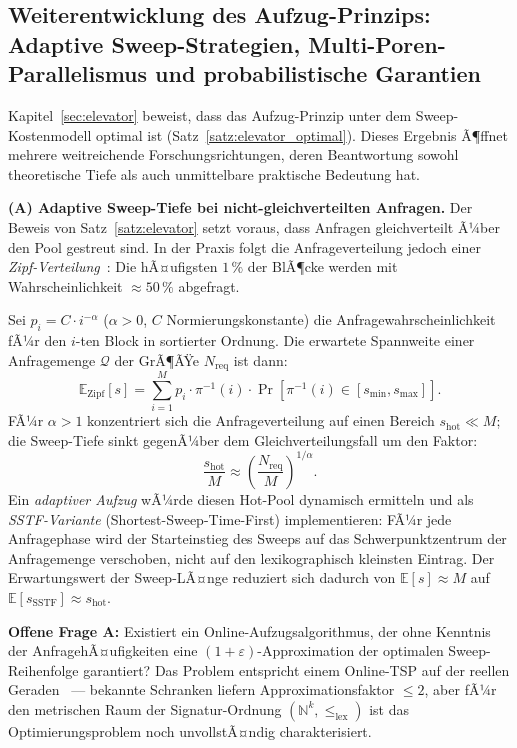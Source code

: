 ﻿\documentclass[a4paper,12pt]{article}
\theoremstyle{definition}
\theoremstyle{plain}
\begin{document}
\subsection{Weiterentwicklung des Aufzug-Prinzips: Adaptive Sweep-Strategien,
           Multi-Poren-Parallelismus und probabilistische Garantien}
\label{ssec:ausblick_elevator}

Kapitel~\ref{sec:elevator} beweist, dass das Aufzug-Prinzip unter dem
Sweep-Kostenmodell optimal ist (Satz~\ref{satz:elevator_optimal}).
Dieses Ergebnis Ã¶ffnet mehrere weitreichende Forschungsrichtungen, deren
Beantwortung sowohl theoretische Tiefe als auch unmittelbare
praktische Bedeutung hat.

\textbf{(A) Adaptive Sweep-Tiefe bei nicht-gleichverteilten Anfragen.}
Der Beweis von Satz~\ref{satz:elevator} setzt voraus, dass Anfragen
gleichverteilt Ã¼ber den Pool gestreut sind.  In der Praxis folgt die
Anfrageverteilung jedoch einer \emph{Zipf-Verteilung}~\cite{knuth1998}:
Die hÃ¤ufigsten $1\,\%$ der BlÃ¶cke werden mit Wahrscheinlichkeit
$\approx 50\,\%$ abgefragt.

Sei $p_i = C \cdot i^{-\alpha}$ ($\alpha > 0$, $C$ Normierungskonstante)
die Anfragewahrscheinlichkeit fÃ¼r den $i$-ten Block in sortierter Ordnung.
Die erwartete Spannweite einer Anfragemenge $\mathcal{Q}$ der GrÃ¶ÃŸe
$N_{\mathrm{req}}$ ist dann:
\[
  \mathbb{E}_{\mathrm{Zipf}}[s]
  = \sum_{i=1}^{M} p_i \cdot \pi^{-1}(i)
    \cdot \Pr[\pi^{-1}(i) \in [s_{\min}, s_{\max}]].
\]
FÃ¼r $\alpha > 1$ konzentriert sich die Anfrageverteilung auf einen
Bereich $s_{\mathrm{hot}} \ll M$; die Sweep-Tiefe sinkt gegenÃ¼ber dem
Gleichverteilungsfall um den Faktor:
\[
  \frac{s_{\mathrm{hot}}}{M} \approx \left(\frac{N_{\mathrm{req}}}{M}\right)^{1/\alpha}.
\]
Ein \emph{adaptiver Aufzug} wÃ¼rde diesen Hot-Pool dynamisch ermitteln
und als \emph{SSTF-Variante} (Shortest-Sweep-Time-First) implementieren:
FÃ¼r jede Anfragephase wird der Starteinstieg des Sweeps auf das
Schwerpunktzentrum der Anfragemenge verschoben, nicht auf den
lexikographisch kleinsten Eintrag.  Der Erwartungswert der Sweep-LÃ¤nge
reduziert sich dadurch von $\mathbb{E}[s] \approx M$ auf
$\mathbb{E}[s_{\mathrm{SSTF}}] \approx s_{\mathrm{hot}}$.

\textbf{Offene Frage A:} Existiert ein Online-Aufzugsalgorithmus,
der ohne Kenntnis der AnfragehÃ¤ufigkeiten eine
$(1+\varepsilon)$-Approximation der optimalen Sweep-Reihenfolge
garantiert?  Das Problem entspricht einem Online-TSP auf der reellen
Geraden~\cite{knuth1998} --- bekannte Schranken liefern
Approximationsfaktor $\le 2$, aber fÃ¼r den metrischen Raum der
Signatur-Ordnung $(\mathbb{N}^k, \le_{\mathrm{lex}})$ ist das
Optimierungsproblem noch unvollstÃ¤ndig charakterisiert.
\end{document}
